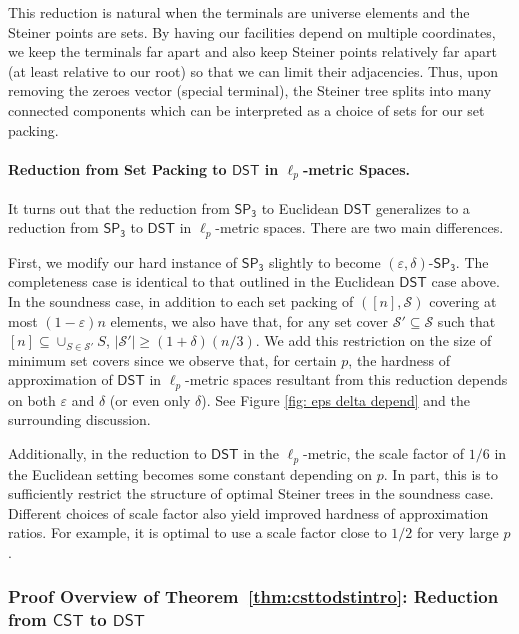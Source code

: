 \documentclass{theoretics}
\newcommand{\1}{\textbf{1}}
\newcommand{\cst}{$\mathsf{CST}$\xspace}
\newcommand{\setpT}{$\mathsf{SP_3}$\xspace}
\newcommand{\dst}{$\mathsf{DST}$\xspace}
\begin{document}
This reduction is natural when the terminals are universe elements and the Steiner points are sets. By having our facilities depend on multiple coordinates, we keep the terminals far apart and also keep Steiner points relatively far apart (at least relative to our root) so that we can limit their adjacencies. Thus, upon removing the zeroes vector (special terminal), the Steiner tree splits into many connected components which can be interpreted as a choice of sets for our set packing.

\paragraph{Reduction from Set Packing to \texorpdfstring{\dst}{DST} in \texorpdfstring{$\ell_p$}{lp}-metric Spaces.}
It turns out that the reduction from \setpT to Euclidean \dst generalizes  to a reduction from \setpT to \dst in $\ell_p$-metric spaces. There are two main differences. 

First, we modify our hard instance of \setpT slightly to become $(\varepsilon, \delta)$-\setpT. The completeness case is identical to that outlined in the Euclidean \dst case above. In the soundness case, in addition to each set packing of $([n], \mathcal{S})$ covering at most $(1-\varepsilon)n$ elements, we also have that, for any set cover $\mathcal{S}' \subseteq \mathcal{S}$ such that $[n] \subseteq \cup_{S \in \mathcal{S}'} S$, $|\mathcal{S}'| \geq (1 + \delta)(n/3)$. We add this restriction on the size of minimum set covers since we observe that, for certain $p$, the hardness of approximation of \dst in $\ell_p$-metric spaces resultant from this reduction depends on both $\varepsilon$ and $\delta$ (or even only $\delta$). See Figure \ref{fig: eps delta depend} and the surrounding discussion.

Additionally, in the reduction to \dst in the $\ell_p$-metric, the scale factor of $1/6$ in the Euclidean setting becomes some constant depending on $p$. In part, this is to sufficiently restrict the structure of optimal Steiner trees in the soundness case. Different choices of scale factor also yield improved hardness of approximation ratios. For example, it is optimal to use a scale factor close to $1/2$ for very large $p$.





\subsubsection{Proof Overview of Theorem~\ref{thm:csttodstintro}:  Reduction from \texorpdfstring{\cst}{CST} to \texorpdfstring{\dst}{DST}}
\end{document}
